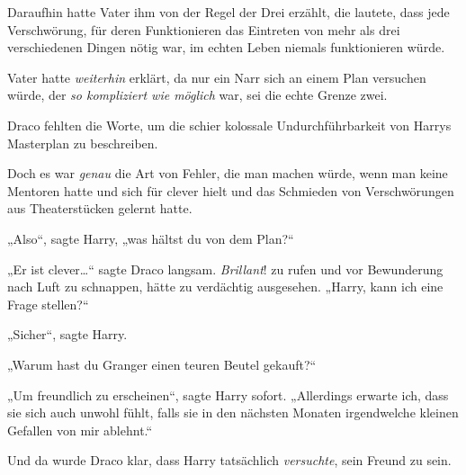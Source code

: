 Daraufhin hatte Vater ihm von der Regel der Drei erzählt, die lautete, dass jede Verschwörung, für deren Funktionieren das Eintreten von mehr als drei verschiedenen Dingen nötig war, im echten Leben niemals funktionieren würde.

Vater hatte \emph{weiterhin} erklärt, da nur ein Narr sich an einem Plan versuchen würde, der \emph{so kompliziert wie möglich} war, sei die echte Grenze zwei.

Draco fehlten die Worte, um die schier kolossale Undurchführbarkeit von Harrys Masterplan zu beschreiben.

Doch es war \emph{genau} die Art von Fehler, die man machen würde, wenn man keine Mentoren hatte und sich für clever hielt und das Schmieden von Verschwörungen aus Theaterstücken gelernt hatte.

„Also“, sagte Harry, „was hältst du von dem Plan?“

„Er ist clever…“ sagte Draco langsam. \emph{Brillant}! zu rufen und vor Bewunderung nach Luft zu schnappen, hätte zu verdächtig ausgesehen. „Harry, kann ich eine Frage stellen?“

„Sicher“, sagte Harry.

„Warum hast du Granger einen teuren Beutel gekauft?“

„Um freundlich zu erscheinen“, sagte Harry sofort. „Allerdings erwarte ich, dass sie sich auch unwohl fühlt, falls sie in den nächsten Monaten irgendwelche kleinen Gefallen von mir ablehnt.“

Und da wurde Draco klar, dass Harry tatsächlich \emph{versuchte}, sein Freund zu sein.

